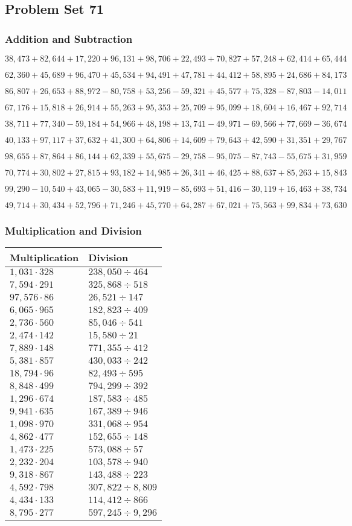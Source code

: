 \hypertarget{problem-set-71}{%
\subsection{Problem Set 71}\label{problem-set-71}}

\hypertarget{addition-and-subtraction-293}{%
\subsubsection{Addition and
Subtraction}\label{addition-and-subtraction-293}}

\(38,473+82,644+17,220+96,131+98,706+22,493+70,827+57,248+62,414+ 65,444\)

\(62,360+45,689+96,470+45,534+94,491+47,781+44,412+58,895+24,686+84,173\)

\(86,807+26,653+88,972-80,758+53,256-59,321+45,577+75,328-87,803-14,011\)

\(67,176+15,818+26,914+55,263+95,353+25,709+95,099+18,604+16,467+92,714\)

\(38,711+77,340-59,184+54,966+48,198+13,741-49,971-69,566+77,669-36,674\)

\(40,133+97,117+37,632+41,300+64,806+14,609+79,643+42,590+31,351+29,767\)

\(98,655+87,864+86,144+62,339+55,675-29,758-95,075-87,743-55,675+31,959\)

\(70,774+30,802+27,815+93,182+14,985+26,341+46,425+88,637+85,263+15,843\)

\(99,290-10,540+43,065-30,583+11,919-85,693+51,416-30,119+16,463+38,734\)

\(49,714+30,434+52,796+71,246+45,770+64,287+67,021+75,563+99,834+73,630\)

\hypertarget{multiplication-and-division-292}{%
\subsubsection{Multiplication and
Division}\label{multiplication-and-division-292}}

\begin{longtable}[]{@{}ll@{}}
\toprule
Multiplication & Division\tabularnewline
\midrule
\endhead
\(1,031\cdot328\) & \(238,050÷464\)\tabularnewline
\(7,594\cdot291\) & \(325,868 ÷518\)\tabularnewline
\(97,576\cdot86\) & \(26,521÷147\)\tabularnewline
\(6,065\cdot965\) & \(182,823÷409\)\tabularnewline
\(2,736\cdot560\) & \(85,046÷541\)\tabularnewline
\(2,474\cdot142\) & \(15,580÷21\)\tabularnewline
\(7,889\cdot148\) & \(771,355÷412\)\tabularnewline
\(5,381\cdot857\) & \(430,033÷242\)\tabularnewline
\(18,794\cdot96\) & \(82,493÷595\)\tabularnewline
\(8,848\cdot499\) & \(794,299÷392\)\tabularnewline
\(1,296\cdot674\) & \(187,583÷485\)\tabularnewline
\(9,941\cdot635\) & \(167,389÷946\)\tabularnewline
\(1,098\cdot970\) & \(331,068÷954\)\tabularnewline
\(4,862\cdot477\) & \(152,655÷148\)\tabularnewline
\(1,473\cdot225\) & \(573,088÷57\)\tabularnewline
\(2,232\cdot204\) & \(103,578÷940\)\tabularnewline
\(9,318\cdot867\) & \(143,488÷223\)\tabularnewline
\(4,592\cdot798\) & \(307,822÷8,809\)\tabularnewline
\(4,434\cdot133\) & \(114,412÷866\)\tabularnewline
\(8,795\cdot277\) & \(597,245÷9,296\)\tabularnewline
\bottomrule
\end{longtable}

